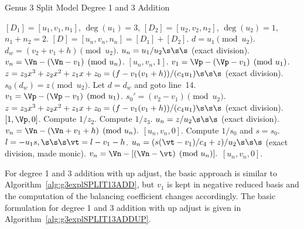\begin{algorithm}[H]
\caption{Genus 3 Split Model Degree 1 and 3 Addition\label{alg:g3explSPLIT13ADD}}
\begin{algorithmic} [1]
\Require $[D_1] = [u_1,v_1,n_1]$, $\deg(u_1) = 3$, $[D_2] = [u_2,v_2,n_2]$, $\deg(u_2) = 1$, $n_1 + n_2 = 2$.
\Ensure $[D] = [u_n,v_n,n_n] = [D_1] + [D_2] $.
\algrule
\vspace{-2pt}
\State $d = u_1 \pmod{u_2}$.
    \State $d_w = (v_2 + v_1 + h) \pmod{u_2}$.
        \State $u_n = u_1/u_2 \s\s\s$ (exact division).
        \State $v_n = \Vn - (\Vn - v_1) \pmod{u_n}$.
        \State \Return $[u_n,v_n,1]$.
    \EndIf
    \State $v_1 = \Vp - (\Vp - v_1) \pmod{u_1}$.
    \State $z = z_3x^3 + z_2x^2 + z_1x + z_0 = (f - v_1(v_1 + h))/(c_4u_1) \s\s\s$ (exact division).  
    \State $s_0(d_w) = z \pmod{u_2}$.
    \State Let $d = d_w$ and goto line~14.
\EndIf
\State $v_1 = \Vp - (\Vp - v_1) \pmod{u_1}$.
\State $s_0' = (v_2 - v_1) \pmod{u_2}$.
\State $z = z_3x^3 + z_2x^2 + z_1x + z_0 = (f - v_1(v_1 + h))/(c_4u_1) \s\s\s$ (exact division).  
         \Return $[1,\Vp,0]$.
        \Else \hspace{3pt} Compute $1/z_2$.
        \EndIf
    \Else \hspace{3pt} Compute $1/z_3$.
    \EndIf
    \State $u_n = z/u_2 \s\s\s$ (exact division).
    \State $v_n = \Vn - (\Vn + v_1 + h) \pmod{u_n}.$
    \State \Return $[u_n,v_n,0]$.
\EndIf
\State Compute $1/s_0$ and $s = s_0$.
\State $l = -u_1s, \s\s\s \vt = l - v_1 - h$.
\State $u_n = (s(\vt - v_1)/c_4 + z)/u_2 \s\s\s$ (exact division, made monic).
\State $v_n = \Vn - [(\Vn - \vt) \pmod{u_n}].$ 
\State \Return $[u_n,v_n,0]$.
\vspace{-2pt}
\end{algorithmic}
\end{algorithm}



For degree 1 and 3 addition with up adjust, the basic approach is similar to
Algorithm~\ref{alg:g3explSPLIT13ADD}, but $v_1$ is kept in negative reduced
basis and the computation of the balancing coefficient changes accordingly. The
basic formulation for degree 1 and 3 addition with up adjust is given in
Algorithm~\ref{alg:g3explSPLIT13ADDUP}.

